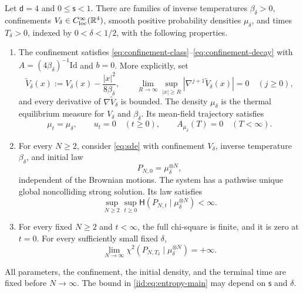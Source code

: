 \documentclass[11pt,reqno]{amsart}
\numberwithin{equation}{section}
\theoremstyle{plain}
\theoremstyle{remark}
\renewcommand{\d}{\mathsf{d}}\newcommand{\s}{\mathsf{s}}
\newcommand{\Hr}{\mathsf H}\newcommand{\dd}{\,\mathrm d}
\newcommand{\Id}{\mathrm{Id}}
\begin{document}
\begin{prop}\label{prop:iid-counterexample}
Let $\d=4$ and $0\le\s<1$. There are families of inverse temperatures $\beta_\delta>0$, confinements $V_\delta\in C^\infty_{\mathrm{loc}}(\mathbb R^4)$, smooth positive probability densities $\mu_\delta$, and times $T_\delta>0$, indexed by $0<\delta<1/2$, with the following properties.
\begin{enumerate}[label=\textup{(\roman*)},leftmargin=2.4em,itemsep=7pt]
\item The confinement satisfies \eqref{eq:confinement-class}--\eqref{eq:confinement-decay} with $A=(4\beta_\delta)^{-1}\Id$ and $b=0$. More explicitly, set
\begin{equation}\label{iid:eq:force-class}
 \widetilde V_\delta(x):=V_\delta(x)-\frac{|x|^2}{8\beta_\delta},\qquad
 \lim_{R\to\infty}\sup_{|x|\ge R}|\nabla^{j+1}\widetilde V_\delta(x)|=0
 \quad(j\ge0),
\end{equation}
and every derivative of $\nabla\widetilde V_\delta$ is bounded. The density $\mu_\delta$ is the thermal equilibrium measure for $V_\delta$ and $\beta_\delta$. Its mean-field trajectory satisfies
\begin{equation}\label{iid:eq:stationary-trajectory}
 \mu_t=\mu_\delta,\qquad u_t=0\quad(t\ge0),\qquad
 A_{\mu_\delta}(T)=0\quad(T<\infty).
\end{equation}
\item For every $N\ge2$, consider \eqref{eq:sde} with confinement $V_\delta$, inverse temperature $\beta_\delta$, and initial law
\begin{equation}\label{iid:eq:initial-law}
 P_{N,0}=\mu_\delta^{\otimes N},
\end{equation}
independent of the Brownian motions. The system has a pathwise unique global noncolliding strong solution. Its law satisfies
\begin{equation}\label{iid:eq:entropy-main}
 \sup_{N\ge2}\sup_{t\ge0}\Hr(P_{N,t}\mid\mu_\delta^{\otimes N})<\infty.
\end{equation}
\item For every fixed $N\ge2$ and $t<\infty$, the full chi-square is finite, and it is zero at $t=0$. For every sufficiently small fixed $\delta$,
\begin{equation}\label{iid:eq:chi-main}
 \lim_{N\to\infty}\chi^2(P_{N,T_\delta}\mid\mu_\delta^{\otimes N})=+\infty.
\end{equation}
\end{enumerate}
All parameters, the confinement, the initial density, and the terminal time are fixed before $N\to\infty$. The bound in \eqref{iid:eq:entropy-main} may depend on $\s$ and $\delta$.
\end{prop}
\end{document}
